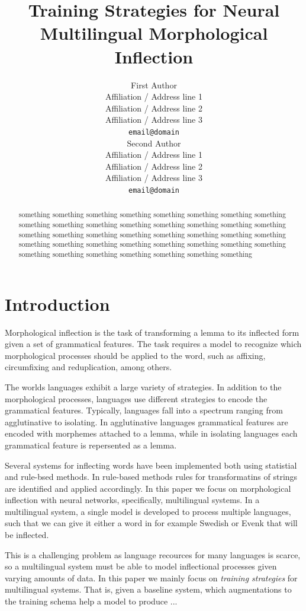 \documentclass[11pt,a4paper]{article}
\title{Training Strategies for Neural Multilingual Morphological Inflection}
\author{First Author \\
  Affiliation / Address line 1 \\
  Affiliation / Address line 2 \\
  Affiliation / Address line 3 \\
  \texttt{email@domain} \\\And
  Second Author \\
  Affiliation / Address line 1 \\
  Affiliation / Address line 2 \\
  Affiliation / Address line 3 \\
  \texttt{email@domain} \\}
\date{}
\begin{document}
\maketitle
\begin{abstract}
something something something something something something
something something something something something something
something something something something something something
something something something something something something
something something something something something something
something something something something something something
something something something 
\end{abstract}

\section{Introduction}

Morphological inflection is the task of transforming a lemma to its
inflected form given a set of grammatical features. 
The task requires a model to recognize which morphological processes
should be applied to the word, such as affixing, circumfixing and
reduplication, among others. 

The worlds languages exhibit a large variety of strategies. In
addition to the morphological processes, languages use different
strategies to encode the grammatical features. Typically, languages
fall into a spectrum ranging from agglutinative to isolating. In
agglutinative languages grammatical features are encoded with
morphemes attached to a lemma, while in isolating languages each
grammatical feature is repersented as a lemma.

Several systems for inflecting words have been implemented both using
statistial and rule-bsed methods. In rule-based methods rules for
transformatins of strings are identified and applied accordingly. In
this paper we focus on morphological inflection with neural networks,
specifically, multilingual systems. In a multilingual system, a single
model is developed to process multiple languages, such that we can
give it either a word in for example Swedish or Evenk that will be
inflected.

This is a challenging problem as language recources for many languages
is scarce, so a multilingual system must be able to model inflectional
processes given varying amounts of data. In this paper we mainly focus
on \emph{training strategies} for multilingual systems. That is, given
a baseline system, which augmentations to the training schema help a
model to produce ...
\end{document}
